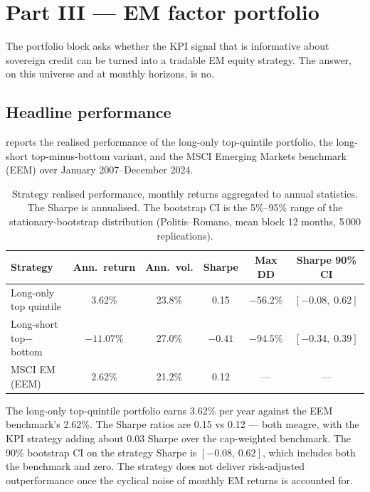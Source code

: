 \section{Part III --- EM factor portfolio}\label{sec:partIII}

The portfolio block asks whether the KPI signal that is informative about sovereign credit can be turned into a tradable EM equity strategy. The answer, on this universe and at monthly horizons, is no.

\subsection{Headline performance}

 reports the realised performance of the long-only top-quintile portfolio, the long-short top-minus-bottom variant, and the MSCI Emerging Markets benchmark (EEM) over January 2007--December 2024.

\begin{table}[h]
  \centering\small
  \begin{threeparttable}
  \caption{Strategy realised performance, monthly returns aggregated to annual statistics. The Sharpe is annualised. The bootstrap CI is the 5\%--95\% range of the stationary-bootstrap distribution (Politis--Romano, mean block 12 months, 5\,000 replications).}
  \label{tab:portfolio_summary}
  \begin{tabular}{lccccc}
    \toprule
    Strategy & Ann.\ return & Ann.\ vol. & Sharpe & Max DD & Sharpe 90\% CI \\
    \midrule
    Long-only top quintile & 3.62\% & 23.8\% & 0.15 & $-56.2\%$ & $[-0.08,\;0.62]$ \\
    Long-short top$-$bottom & $-11.07\%$ & 27.0\% & $-0.41$ & $-94.5\%$ & $[-0.34,\;0.39]$ \\
    MSCI EM (EEM) & 2.62\% & 21.2\% & 0.12 & --- & --- \\
    \bottomrule
  \end{tabular}
  \end{threeparttable}
\end{table}

The long-only top-quintile portfolio earns 3.62\% per year against the EEM benchmark's 2.62\%. The Sharpe ratios are 0.15 vs 0.12 --- both meagre, with the KPI strategy adding about $0.03$ Sharpe over the cap-weighted benchmark. The 90\% bootstrap CI on the strategy Sharpe is $[-0.08,\,0.62]$, which includes both the benchmark and zero. The strategy does not deliver risk-adjusted outperformance once the cyclical noise of monthly EM returns is accounted for.

